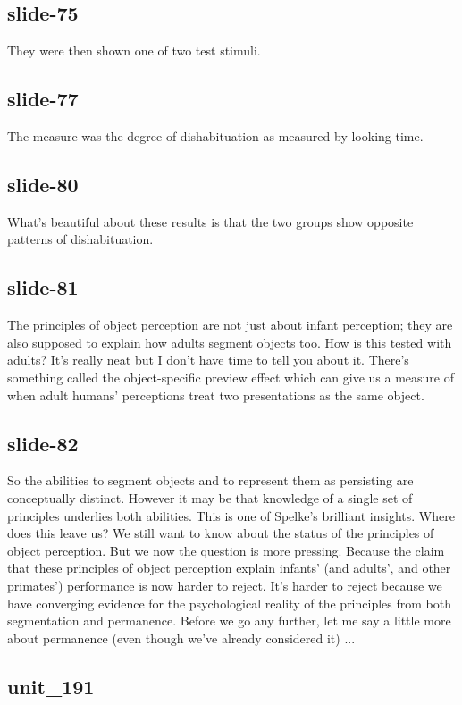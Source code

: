 \documentclass[12pt,\papersize]{extarticle}
\begin{document}
 
\subsection{slide-75}
They were then shown one of two test stimuli.
 
 
\subsection{slide-77}
The measure was the degree of dishabituation as measured by looking time.
 
 
\subsection{slide-80}
What's beautiful about these results is that the two groups show opposite patterns of dishabituation.
 
 
\subsection{slide-81}
The principles of object perception are not just about infant perception; they are also supposed to explain how adults segment objects too.
How is this tested with adults?
It's really neat but I don't have time to tell you about it.
There's something called the object-specific preview effect which can give us a measure of when adult humans' perceptions treat two presentations as the same object.
 
 
\subsection{slide-82}
So the abilities to segment objects and to represent them as persisting are conceptually distinct.
However it may be that knowledge of a single set of principles underlies both abilities.
This is one of Spelke's brilliant insights.
Where does this leave us?
We still want to know about the status of the principles of object perception.
But we now the question is more pressing.
Because the claim that these principles of object perception explain infants' (and adults', and other primates') performance is now harder to reject.
It's harder to reject because we have converging evidence for the psychological reality of the principles from both segmentation and permanence.
Before we go any further, let me say a little more about permanence (even though we've already considered it) ...
 
 
\subsection{unit\_191}
 
\end{document}
